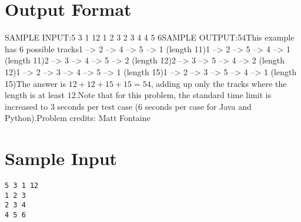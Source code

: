 \documentclass[12pt]{article}
\begin{document}
\section*{Output Format}
SAMPLE INPUT:5 3 1 12
1 2 3
2 3 4
4 5 6SAMPLE OUTPUT:54This example has 6 possible tracks1 --> 2 --> 4 --> 5 --> 1         (length 11)1 --> 2 --> 5 --> 4 --> 1         (length 11)2 --> 3 --> 4 --> 5 --> 2         (length 12)2 --> 3 --> 5 --> 4 --> 2         (length 12)1 --> 2 --> 3 --> 4 --> 5 --> 1   (length 15)1 --> 2 --> 3 --> 5 --> 4 --> 1   (length 15)The answer is $12+12+15+15=54$, adding up only the tracks where the length is at
least $12$.Note that for this problem, the standard time limit is increased to 3 seconds
per test case (6 seconds per case for Java and Python).Problem credits: Matt Fontaine

\section*{Sample Input}
\begin{verbatim}
5 3 1 12
1 2 3
2 3 4
4 5 6
\end{verbatim}
\end{document}

